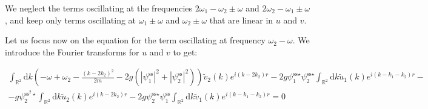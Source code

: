 \documentclass[12pt]{article}
\begin{document}

We neglect the terms oscillating at the frequencies $2 \omega_1 - \omega_2 \pm \omega$ and $2 \omega_2 - \omega_1 \pm \omega$, and keep only terms oscillating at $\omega_1 \pm \omega$ and $\omega_2 \pm \omega$ that are linear in $u$ and $v$.

Let us focus now on the equation for the term oscillating at frequency $\omega_2-\omega$. We introduce the Fourier transforms for $u$ and $v$ to get:






\begin{multline}
\label{eq:starteq}
\int_{\mathbb{R}^{2}}\mathrm{d}k\left(-\omega+\omega_{2}-\frac{(k-2k_{2})^{2}}{2m}-2g\left(|\psi_{1}^{\text{ss}}|^{2}+|\psi_{2}^{\text{ss}}|^{2}\right)\right)\tilde{v}_{2}(k)e^{i(k-2k_{2})r}-2g\psi_{1}^{\text{ss}\star}\psi_{2}^{\text{ss}\star}\int_{\mathbb{R}^{2}}\mathrm{d}k\tilde{u}_{1}(k)e^{i(k-k_{1}-k_{2})r}-\\
-g\psi_{2}^{\text{ss}^2\star}\int_{\mathbb{R}^{2}}\mathrm{d}k \tilde{u}_{2}(k)e^{i(k-2k_{2})r}-2g\psi_{2}^{\text{ss}\star}\psi_{1}^{\text{ss}}\int_{\mathbb{R}^{2}}\mathrm{d}k \tilde{v}_{1}(k)e^{i(k-k_{1}-k_{2})r}=0
\end{multline}
\end{document}
